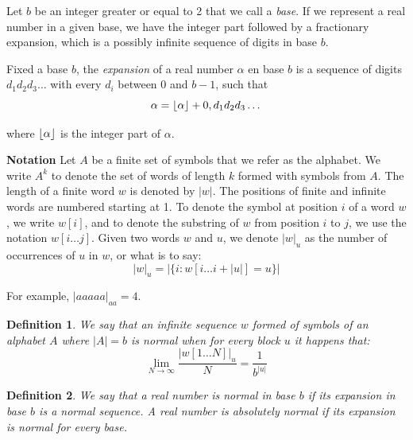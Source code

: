 \documentclass[11pt,a4paper]{tesis}
\newtheorem{theorem}{Theorem}[]
\newtheorem{definition}{Definition}[]
\DeclarePairedDelimiter{\floor}{\lfloor}{\rfloor}
\newcommand{\note}[1]{\textbf{\color{red}{#1}}}
\begin{document}
Let $b$ be an integer greater or equal to 2 that we call a \textit{base}. If we represent a real number in a given base, we have the integer part followed by a fractionary expansion, which is a possibly infinite sequence of digits in base $b$.

Fixed a base $b$, the \textit{expansion} of a real number $\alpha$ en base $b$ is a sequence of digits $d_1d_2d_3\dots$ with every $d_i$ between 0 and $b-1$, such that
$$\alpha = \floor{\alpha} + 0,d_1d_2d_3\dots$$

where $\floor{\alpha}$ is the integer part of $\alpha$.

\textbf{Notation}
Let $A$ be a finite set of symbols that we refer as the alphabet. We write $A^k$ to denote the set of words of length $k$ formed with symbols from $A$. The length of a finite word $w$ is denoted by $|w|$.
The positions of finite and infinite words are numbered starting at 1. To denote the symbol at position $i$ of a word $w$, we write $w[i]$, and to denote the substring of $w$ from position $i$ to $j$, we use the notation $w[i \dots j]$.  
Given two words $w$ and $u$, we denote $|w|_u$ as the number of occurrences of $u$ in $w$, or what is to say:
    $$|w|_u = |\{i: w[i \dots i + |u|] = u\}|$$

For example, $|aaaaa|_{aa} = 4$.
\\

\begin{definition}
    We say that an infinite sequence $w$ formed of symbols of an alphabet $A$ where $|A| = b$ is \textit{normal} when for every block $u$ it happens that:
    $$\lim_{N\to\infty} \frac{|w[1 \dots N]|_u}{N} = \frac{1}{b^{|u|}}$$
\end{definition}

\begin{definition}
    We say that a real number is {\em normal} in base $b$ if its expansion in base $b$ is a normal sequence. 
    A real number is \textit{absolutely normal} if its expansion is normal for every base.
\end{definition}


\end{document}
